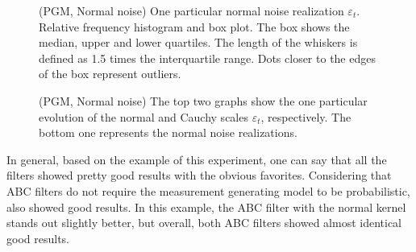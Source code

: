 \begin{figure}[!ht]
\centering
\caption{(PGM, Normal noise) One particular normal noise realization \(\varepsilon_t\). Relative frequency histogram and box plot. The box shows the median, upper and lower quartiles. The length of the whiskers is defined as 1.5 times the interquartile range. Dots closer to the edges of the box represent outliers.}
\label{fig:pgm_measurement_noise_normal}
\end{figure}

\begin{figure}[!ht]
\centering
\caption{(PGM, Normal noise) The top two graphs show the one particular evolution of the normal and Cauchy scales \(\varepsilon_t\), respectively. The bottom one represents the normal noise realizations.}
\label{fig:pgm_abc_scales_evolution_normal}
\end{figure}

In general, based on the example of this experiment, one can say that all the filters showed pretty good results with the obvious favorites. Considering that ABC filters do not require the measurement generating model to be probabilistic, also showed good results. In this example, the ABC filter with the normal kernel stands out slightly better, but overall, both ABC filters showed almost identical good results.

